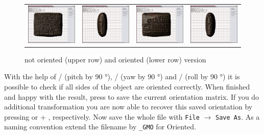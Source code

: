 \begin{figure}[H]
\begin{tabular}{cccc}
  \includegraphics[width=3cm]{figs/oriented_01} & \includegraphics[width=3cm]{figs/oriented_02} & \includegraphics[width=3cm]{figs/oriented_03} & \includegraphics[width=3cm]{figs/oriented_04}
 \end{tabular}
  \caption{not oriented (upper row) and oriented (lower row) version}
\end{figure}

With the help of / (pitch by 90 °), / (yaw by 90 °) and / (roll by 90 °) it is possible to check if all sides of the object are oriented correctly.
When finished and happy with the result, press \! to save the current orientation matrix. If you do additional  transformation you are now able  to recover this saved orientation by pressing \! or \! + \!\!, respectively. Now save the whole file with \texttt{File} $\rightarrow$ \texttt{Save As}. As a naming convention extend the filename by {\tt \_GMO} for \GigaMesh Oriented.

